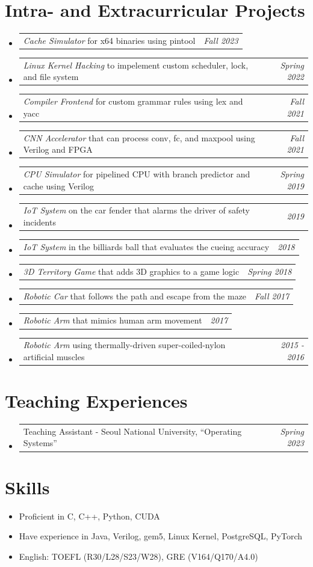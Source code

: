 \documentclass[a4paper]{article}
\makeatletter
\newcommand{\resumeSubheadingSimple}[2]{
  \vspace{-1pt}\item
	\begin{tabular*}{0.97\textwidth}{l@{\extracolsep{\fill}}r}
	  #1 & \textit{#2} \\
	\end{tabular*}
  \vspace{-1pt}
}
\newcommand{\resumeSubheadingVerySimple}[1]{
	\vspace{-1pt}\item #1
	\vspace{-1pt}
}
\newcommand{\resumeSubHeadingListStart}{\begin{itemize}[leftmargin=*]}
\newcommand{\resumeSubHeadingListEnd}{\end{itemize}}
\makeatother
\begin{document}
\section{Intra- and Extracurricular Projects}
\resumeSubHeadingListStart
	\resumeSubheadingSimple{
		\textit{Cache Simulator} for x64 binaries using pintool
	}{Fall 2023}
	\resumeSubheadingSimple{
		\textit{Linux Kernel Hacking} to impelement custom scheduler, lock, and file system
	}{Spring 2022}
	\resumeSubheadingSimple{
		\textit{Compiler Frontend} for custom grammar rules using lex and yacc
	}{Fall 2021}
	\resumeSubheadingSimple{
		\textit{CNN Accelerator} that can process conv, fc, and maxpool using Verilog and FPGA
	}{Fall 2021}
	\resumeSubheadingSimple{
		\textit{CPU Simulator} for pipelined CPU with branch predictor and cache using Verilog
	}{Spring 2019}
	\resumeSubheadingSimple{
		\textit{IoT System} on the car fender that alarms the driver of safety incidents
	}{2019}
	\resumeSubheadingSimple{
		\textit{IoT System} in the billiards ball that evaluates the cueing accuracy
	}{2018}
	\resumeSubheadingSimple{
		\textit{3D Territory Game} that adds 3D graphics to a game logic
	}{Spring 2018}
	\resumeSubheadingSimple{
		\textit{Robotic Car} that follows the path and escape from the maze
	}{Fall 2017}
	\resumeSubheadingSimple{
		\textit{Robotic Arm} that mimics human arm movement
	}{2017}
	\resumeSubheadingSimple{
		\textit{Robotic Arm} using thermally-driven super-coiled-nylon artificial muscles
	}{2015 - 2016}
\resumeSubHeadingListEnd

\section{Teaching Experiences}
\resumeSubHeadingListStart
	\resumeSubheadingSimple{
		Teaching Assistant - Seoul National University, ``Operating Systems''
	}{Spring 2023}
\resumeSubHeadingListEnd

\section{Skills}
\resumeSubHeadingListStart
	\resumeSubheadingVerySimple{
		Proficient in C, C++, Python, CUDA
	}
	\resumeSubheadingVerySimple{
		Have experience in Java, Verilog, gem5, Linux Kernel, PostgreSQL, PyTorch
	}
	\resumeSubheadingVerySimple{
		English: TOEFL (R30/L28/S23/W28), GRE (V164/Q170/A4.0)
	}
\resumeSubHeadingListEnd
\end{document}
